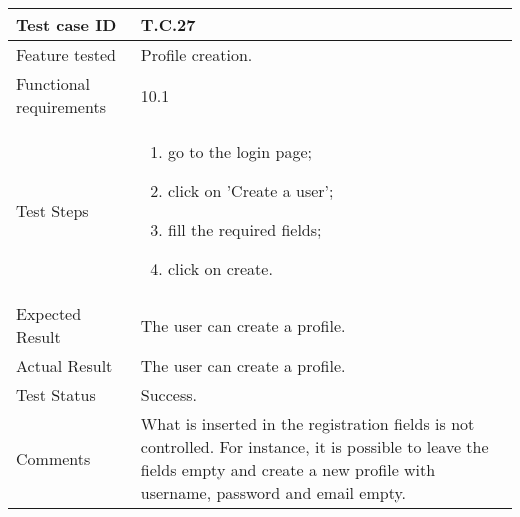 \begin{table}[H]
	\begin{center}
		\begin{tabular}{ | p{} | p{} | }
		\hline
		Test case ID & T.C.27\\
		\hline
		Feature tested & Profile creation.\\
    	\hline
		Functional requirements & 10.1  \\
		\hline
		Test Steps & 
			\begin{enumerate}
				\item go to the login page;
				\item click on 'Create a user';
				\item fill the required fields;
				\item click on create.
			\end{enumerate} \\
		\hline
		Expected Result & The user can create a profile.\\
		\hline
		Actual Result & The user can create a profile.\\ 
		\hline
		Test Status & \color{ForestGreen}Success.\\ 
		\hline
		Comments & What is inserted in the registration fields is not controlled. For instance, it is possible to leave the fields empty and create a new profile with username, password and email empty. \\
		\hline
		
		\end{tabular}
	\end{center}
\end{table}
